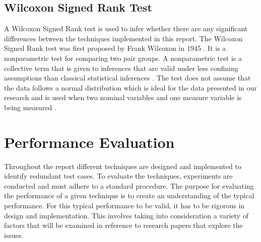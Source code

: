 \documentclass[11pt
              , a4paper
              , twoside
              , openright
              ]{report}
\begin{document}
\subsection{Wilcoxon Signed Rank Test}

A Wilcoxon Signed Rank test is used to infer whether there are any significant differences between the techniques implemented in this report. The Wilcoxon Signed Rank test was first proposed by Frank Wilcoxon in 1945 \cite{wilcoxon1945individual}. It is a nonparametric test for comparing two pair groups. A nonparametric test is a collective term that is given to inferences that are valid under less confining assumptions than classical statistical inferences \cite{nonparametric}. The test does not assume that the data follows a normal distribution which is ideal for the data presented in our research and is used when two nominal variables and one measure variable is being measured \cite{mcdonald2009handbook}.

\section{Performance Evaluation}
\label{performanceEvalBG}
Throughout the report different techniques are designed and implemented to identify redundant test cases. To evaluate the techniques, experiments are conducted and must adhere to a standard procedure. The purpose for evaluating the performance of a given technique is to create an understanding of the typical performance. For this typical performance to be valid, it has to be rigorous in design and implementation. This involves taking into consideration a variety of factors that will be examined in reference to research papers that explore the issues.
\end{document}
